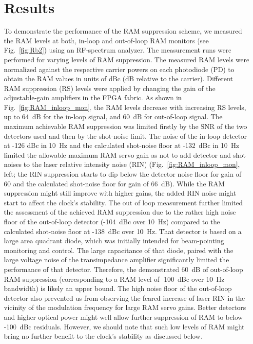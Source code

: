 \documentclass[aip,graphicx]{revtex4-2}
\begin{document}
	\section{Results}
	To demonstrate the performance of the RAM suppression scheme, we measured the RAM levels at both, in-loop and out-of-loop RAM monitors (see Fig.~\ref{fig:Rb2}) using an RF-spectrum analyzer. The measurement runs were performed for varying levels of RAM suppression. The measured RAM levels were normalized against the respective carrier powers on each photodiode (PD) to obtain the RAM values in units of dBc (dB relative to the carrier). Different RAM suppression (RS) levels were applied by changing the gain of the adjustable-gain amplifiers in the FPGA fabric. As shown in Fig.~\ref{fig:RAM_inloop_mon}, the RAM levels decrease with increasing RS levels, up to 64~dB for the in-loop signal, and 60~dB for out-of-loop signal. The maximum achievable RAM suppression was limited firstly by the SNR of the two detectors used and then by the shot-noise limit. The noise of the in-loop detector at -126 dBc in 10~Hz and the calculated shot-noise floor at -132~dBc in 10~Hz limited the allowable maximum RAM servo gain as not to add detector and shot noises to the laser relative intensity noise (RIN) (Fig.~\ref{fig:RAM_inloop_mon}, left; the RIN suppression starts to dip below the detector noise floor for gain of 60 and the calculated shot-noise floor for gain of 66~dB). While the RAM suppression might still improve with higher gains, the added RIN noise might start to affect the clock’s stability. The out of loop measurement further limited the assessment of the achieved RAM suppression due to the rather high noise floor of the out-of-loop detector (-104~dBc over 10~Hz) compared to the calculated shot-noise floor at -138~dBc over 10~Hz. That detector is based on a large area quadrant diode, which was initially intended for beam-pointing monitoring and control. The large capacitance of that diode, paired with the large voltage noise of the transimpedance amplifier significantly limited the performance of that detector. Therefore, the demonstrated 60~dB of out-of-loop RAM suppression (corresponding to a RAM level of -100~dBc over 10~Hz bandwidth) is likely an upper bound. The high noise floor of the out-of-loop detector also prevented us from observing the feared increase of laser RIN in the vicinity of the modulation frequency for large RAM servo gains. Better detectors and higher optical power might well allow further suppression of RAM to below -100~dBc residuals. However, we should note that such low levels of RAM might bring no further benefit to the clock’s stability as discussed below. 
	
\end{document}
